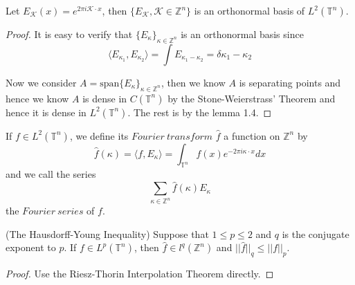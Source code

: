 \documentclass[lang=en, color=blue, ]{elegantbook}
\newcommand{\Z}{\mathbb{Z}}
\newcommand{\inK}{\kappa}
\newcommand{\T}{\mathbb{T}}
\begin{document}
\begin{theorem}
    Let $E_{\mathcal{K}}(x) = e^{2\pi i \mathcal{K}\cdot x}$, then $\{E_{\mathcal{K}}, \mathcal{K}\in \mathbb{Z}^n\}$ is an orthonormal basis of $L^2(\T^n)$.
\end{theorem}
\begin{proof}\par
    It is easy to verify that $\{E_{\inK}\}_{\inK \in \Z^n}$ is an orthonormal basis since
    \[
    \langle E_{\inK_1},E_{\inK_2} \rangle = \int E_{\inK_1 - \inK_2} = \delta{\kappa_1-\kappa_2}
    \]\par
    Now we consider $A = \text{span}\{E_{\kappa}\}_{\kappa\in\Z^n}$, then we know $A$ is separating points and hence we know $A$ is dense in $C(\T^n)$ by the Stone-Weierstrass' Theorem and hence it is dense in $L^2(\T^n)$. The rest is by the lemma 1.4.
\end{proof}

\begin{definition}
    If $f\in L^2(\T^n)$, we define its $Fourier\ transform$ $\hat{f}$ a function on $\Z^n$ by
    \[
    \hat{f}(\kappa) = \langle f,E_{\kappa}\rangle = \int_{\T^n}f(x)e^{-2\pi i \kappa\cdot x} dx
    \]
    and we call the series
    \[
    \sum\limits_{\kappa\in\Z^n}\hat{f}(\kappa)E_{\kappa}
    \]
    the $Fourier\ series$ of $f$.
\end{definition}

\begin{theorem}
    (The Hausdorff-Young Inequality) Suppose that $1\leq p \leq 2$ and $q$ is the conjugate exponent to $p$. If $f\in L^p(\T^n)$, then $\hat{f}\in l^q(\Z^n)$ and $||\hat{f}||_q \leq ||f||_p$.
\end{theorem}
\begin{proof}\par
    Use the Riesz-Thorin Interpolation Theorem directly.
\end{proof}
\end{document}
